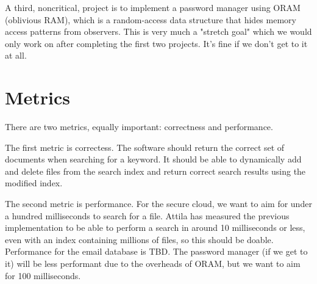 \documentclass[onecolumn, draftclsnofoot,10pt, compsoc]{IEEEtran}
\begin{document}



A third, noncritical, project is to implement a password manager using ORAM (oblivious RAM), which is a random-access data structure that hides memory access patterns from observers.
This is very much a "stretch goal" which we would only work on after completing the first two projects.
It's fine if we don't get to it at all.


\section{Metrics}

There are two metrics, equally important: correctness and performance.


The first metric is correctess.
The software should return the correct set of documents when searching for a keyword.
It should be able to dynamically add and delete files from the search index and return correct search results using the modified index.


The second metric is performance.
For the secure cloud, we want to aim for under a hundred milliseconds to search for a file. %
Attila has measured the previous implementation to be able to perform a search in around 10 milliseconds or less, even with an index containing millions of files, so this should be doable.
Performance for the email database is TBD.
The password manager (if we get to it) will be less performant due to the overheads of ORAM, but we want to aim for 100 milliseconds.


{}
\end{document}
